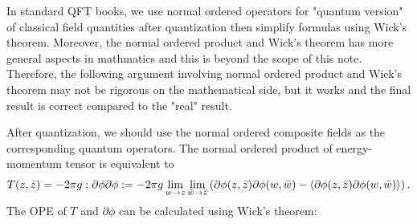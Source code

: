 \documentclass[10pt]{article}
\begin{document}
\begin{intu}
    In standard QFT books, we use normal ordered operators for "quantum version" of classical field quantities after quantization then simplify formulas using Wick's theorem.
    Moreover, the normal ordered product and Wick's theorem has more general aspects in mathmatics and this is beyond the scope of this note\snm.
    Therefore, the following argument involving normal ordered product and Wick's theorem may not be rigorous on the mathematical side, but it works and the final result is correct compared to the "real" result.
\end{intu}
After quantization, we should use the normal ordered composite fields as the corresponding quantum operators.
The normal ordered product of energy-momentum tensor is equivalent to
\begin{align}
    T(z,\bar{z})=-2\pi g:\partial\phi\partial\phi:=-2\pi g\lim_{w\to z}\lim_{\bar{w}\to\bar{z}}\left(\partial\phi(z,\bar{z})\partial\phi(w,\bar{w})-\expval{\partial\phi(z,\bar{z})\partial\phi(w,\bar{w})}\right).
\end{align}
The OPE of $T$ and $\partial\phi$ can be calculated using Wick's theorem:
\end{document}

